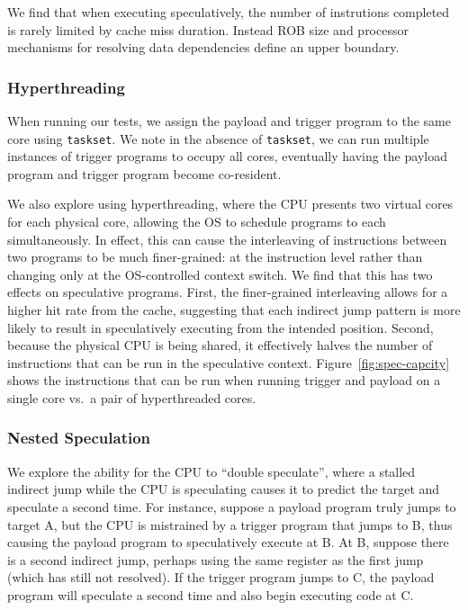 \medskip

We find that when executing speculatively, the number of instrutions completed
is rarely limited by cache miss duration. Instead
ROB size and processor mechanisms for resolving
data dependencies define an upper boundary.


\subsubsection{Hyperthreading}

When running our tests, we assign the payload and trigger program to the same
core using \texttt{taskset}. We note in the absence of \texttt{taskset}, we can
run multiple instances of trigger programs to occupy all cores, eventually
having the payload program and trigger program become co-resident.

We also explore using hyperthreading, where the CPU presents two virtual cores
for each physical core, allowing the OS to schedule programs to each
simultaneously. In effect, this can cause the interleaving of instructions
between two programs to be much finer-grained: at the instruction level rather
than changing only at the OS-controlled context switch. We find that this
has two effects on speculative programs. First, the finer-grained interleaving
allows for a higher hit rate from the cache, suggesting that each indirect jump
pattern is more likely to result in speculatively executing from the intended
position. %
Second, because the physical CPU is being shared, it effectively halves the
number of instructions that can be run in the speculative context.
Figure~\ref{fig:spec-capcity} shows the instructions that can be run when
running trigger and payload on a single core vs.\ a pair of hyperthreaded cores.

\subsubsection{Nested Speculation}

We explore the ability for the CPU to ``double speculate'', where a stalled
indirect jump while the CPU is speculating causes it to predict the target and
speculate a second time. For instance, suppose a payload program truly jumps to
target A, but the CPU is mistrained by a trigger program that jumps to B, thus
causing the payload program to speculatively execute at B. At B, suppose there
is a second indirect jump, perhaps using the same register as the first jump
(which has still not resolved). If the trigger program jumps to C, the payload
program will speculate a second time and also begin executing code at C.

